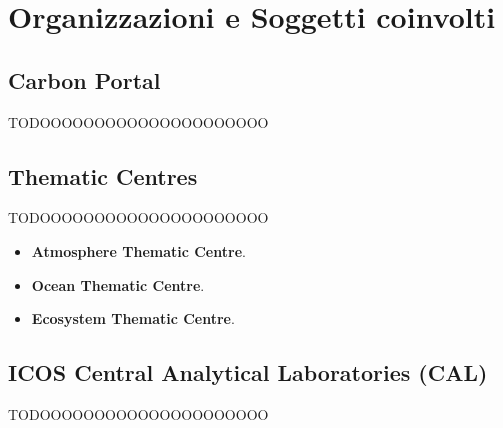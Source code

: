 \chapter{Organizzazioni e Soggetti coinvolti}
\label{chap:soggetti}

\section{Carbon Portal}
\label{section:carbonportal}
TODOOOOOOOOOOOOOOOOOOOOO

\section{Thematic Centres}
\label{section:thematic}
TODOOOOOOOOOOOOOOOOOOOOO

\begin{itemize}
    \item \textbf{Atmosphere Thematic Centre}.
    \item \textbf{Ocean Thematic Centre}.
    \item \textbf{Ecosystem Thematic Centre}.
\end{itemize}

\section{ICOS Central Analytical Laboratories (CAL)}
\label{section:CAL}
TODOOOOOOOOOOOOOOOOOOOOO